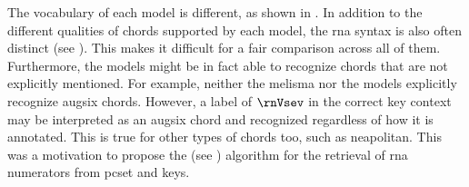 
The vocabulary of each model is different, as shown in
. In addition to the different
qualities of chords supported by each model, the \gls{rna}
syntax is also often distinct (see
). This
makes it difficult for a fair comparison across all of them.
Furthermore, the models might be in fact able to recognize
chords that are not explicitly mentioned. For example,
neither the \gls{melisma} nor the
\textcite{mcleod2021modular} models explicitly recognize
\gls{augsix} chords. However, a label of $\rnVsev$ in the
correct key context may be interpreted as an \gls{augsix}
chord and recognized regardless of how it is annotated. This
is true for other types of chords too, such as
\gls{neapolitan}. This was a motivation to propose the
\algorithmrn{} (see
)
algorithm for the retrieval of \gls{rna} numerators from
\gls{pcset} and keys. 

